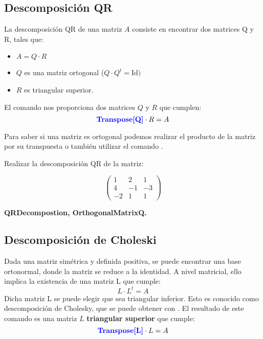 \documentclass[a4paper,10pt, draft]{article}
\newcommand{\com}[1]{\textbf{\color{blue}{#1}}}
\newenvironment{ejer}{\begin{tcolorbox}[center title, title=Ejercicios,
fonttitle=\sffamily\bfseries,colback=blue!5,colframe=orange]}{\end{tcolorbox}}
\newenvironment{funciones}{\begin{tcolorbox}[center title, title=Nuevas funciones, fonttitle=\sffamily\bfseries, colback=green!5!white,colframe=red!75!black]}{\end{tcolorbox}\bigskip}
\begin{document}
  \newpage

\subsection{Descomposición QR}

La descomposición QR de una matriz $A$ consiste en encontrar dos matrices Q y R, tales que:

\begin{itemize}

 \item $A=Q\cdot R$ 


\item  $Q$ es una matriz ortogonal ($Q\cdot Q^t=\mathrm{Id})$


\item  $R$ es triangular superior.

\end{itemize}

El comando \com{QRDecomposition[M]} nos proporciona dos matrices $Q$ y $R$ que cumplen:
$$
\mathrm{\com{Transpose[Q]}}\cdot R = A
$$

Para saber si una matriz es ortogonal podemos realizar el producto de la matriz por su transpuesta o también utilizar el comando \com{OrthogonalMatrixQ[M]}.

\begin{ejer}

Realizar la descomposición QR de la matriz:

$$
\begin{pmatrix}
1 & 2 &1\\
4& -1&-3\\
-2&1&1
\end{pmatrix}
$$

\end{ejer}  

\begin{funciones}

\textbf{QRDecompostion, OrthogonalMatrixQ.}

\end{funciones}


\newpage



\subsection{Descomposición de Choleski}

Dada una matriz simétrica y definida positiva,  se puede encontrar una base ortonormal, donde la matriz se reduce a la identidad. A nivel matricial, ello implica la existencia de una matriz L que cumple:
$$
L\cdot L^t=A
$$
Dicha matriz L se puede elegir que sea triangular inferior. Esto es conocido como descomposición de Cholesky, que se puede obtener con \com{CholeskyDecomposition[M]}. El resultado de este comando es una matriz $L$ \textbf{triangular superior} que cumple:
$$
\mathrm{\com{Transpose[L]}}\cdot L = A
$$
\end{document}
